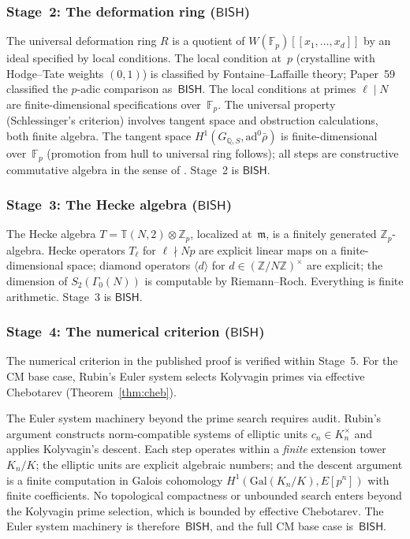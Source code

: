 \documentclass[11pt]{article}
\theoremstyle{plain}
\theoremstyle{definition}
\theoremstyle{remark}
\newcommand{\Z}{\mathbb{Z}}
\newcommand{\Q}{\mathbb{Q}}
\newcommand{\F}{\mathbb{F}}
\newcommand{\fm}{\mathfrak{m}}
\newcommand{\Gal}{\mathrm{Gal}}
\newcommand{\BISH}{\mathsf{BISH}}
\begin{document}
\subsubsection{Stage~2: The deformation ring (\texorpdfstring{$\BISH$}{BISH})}

The universal deformation ring $R$ is a quotient of
$W(\F_p)[[x_1, \ldots, x_d]]$ by an ideal specified by local
conditions.  The local condition at~$p$ (crystalline with
Hodge--Tate weights $(0,1)$) is classified by Fontaine--Laffaille
theory; Paper~59 \cite{Paper59} classified the $p$-adic comparison
as~$\BISH$.  The local conditions at primes $\ell \mid N$ are
finite-dimensional specifications over~$\F_p$.  The universal
property (Schlessinger's criterion) involves tangent space and
obstruction calculations, both finite algebra.  The tangent space
$H^1(G_{\Q,S}, \mathrm{ad}^0\bar{\rho})$ is finite-dimensional
over~$\F_p$ (promotion from hull to universal ring follows); all
steps are constructive commutative algebra in the sense of
\cite{MRR1988}.  Stage~2 is $\BISH$.

\subsubsection{Stage~3: The Hecke algebra (\texorpdfstring{$\BISH$}{BISH})}

The Hecke algebra $T = \mathbb{T}(N, 2) \otimes \Z_p$, localized
at~$\fm$, is a finitely generated $\Z_p$-algebra.
Hecke operators $T_\ell$ for $\ell \nmid Np$ are explicit linear
maps on a finite-dimensional space; diamond operators
$\langle d \rangle$ for $d \in (\Z/N\Z)^\times$ are explicit;
the dimension of $S_2(\Gamma_0(N))$ is computable by
Riemann--Roch.  Everything is finite arithmetic.  Stage~3 is $\BISH$.

\subsubsection{Stage~4: The numerical criterion (\texorpdfstring{$\BISH$}{BISH})}\label{sec:stage4cm}

The numerical criterion in the published proof is verified within
Stage~5.  For the CM base case, Rubin's Euler system \cite{Rubin1991}
selects Kolyvagin primes via effective Chebotarev
(Theorem~\ref{thm:cheb}).

The Euler system machinery beyond the prime search requires audit.
Rubin's argument constructs norm-compatible systems of elliptic units
$c_n \in K_n^\times$ and applies Kolyvagin's descent.  Each step
operates within a \emph{finite} extension tower $K_n/K$; the
elliptic units are explicit algebraic numbers; and the descent
argument is a finite computation in Galois cohomology
$H^1(\Gal(K_n/K), E[p^n])$ with finite coefficients.  No
topological compactness or unbounded search enters beyond the
Kolyvagin prime selection, which is bounded by effective Chebotarev.
The Euler system machinery is therefore~$\BISH$, and the full CM
base case is~$\BISH$.
\end{document}

